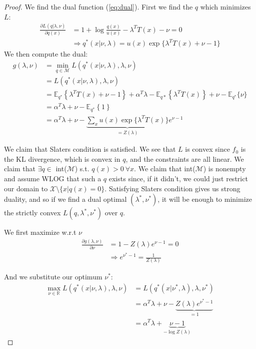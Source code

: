 \documentclass[]{article}
\theoremstyle{mattstyle}
\theoremstyle{definition}
\begin{document}
\begin{proof}
	We find the dual function (\ref{eq:dual}). First we find the $q$ which minimizes $L$:
	\begin{align*}
	\frac{\partial L(q| \lambda, \nu)}{\partial q(x)} &= 1 + \log \frac{q(x)}{u(x)} -  \lambda^TT(x) - \nu = 0\\
	&\Rightarrow q^*(x| \nu, \lambda) = u(x)\exp\{ \lambda^TT(x) + \nu -1\}
	\end{align*}
	We then compute the dual:
	\begin{align*}
	g(\lambda, \nu) &=\min\limits_{q\in \mathcal{M}} L(q^*(x| \nu, \lambda),\lambda,\nu)\\
	&= L(q^*(x| \nu, \lambda),\lambda,\nu)\\
	&= \mathbb{E}_{q^*}\left\{ \lambda^TT(x) + \nu -1 \right\} +  \alpha^T\lambda - \mathbb{E}_{q*}\left\{\lambda^TT(x)\right\} + \nu - \mathbb{E}_{q^*}\{\nu\}\\
	&=\alpha^T\lambda + \nu - \mathbb{E}_{q^*}\left\{1\right\}\\
	&=\alpha^T\lambda + \nu - \underbrace{\sum_x u(x)\exp\{ \lambda^TT(x)\}}_{=Z(\lambda)}e^{\nu -1}
	\end{align*}
	
	We claim that Slaters condition is satisfied. We see that $L$ is convex since $f_0$ is the KL divergence, which is convex in $q$, and the constraints are all linear. We claim that $\exists q \in$ int($\mathcal{M}$) s.t. $q(x)>0 \ \forall x$. We claim that int($\mathcal{M}$) is nonempty and assume WLOG that such a $q$ exists since, if it didn't, we could just restrict our domain to $\mathcal{X} \setminus \{ x | q(x) = 0 \}$. Satisfying Slaters condition gives us strong duality, and so if we find a dual optimal $(\lambda^*, \nu^*)$, it will be enough to minimize the strictly convex $L(q, \lambda^*, \nu^*)$ over $q$.
	
	We first maximize w.r.t $\nu$
	\begin{align*}
	\frac{\partial  g(\lambda, \nu)}{\partial \nu } &= 1 - Z(\lambda)e^{\nu -1} = 0\\
	&\Rightarrow  e^{\nu^*-1} = \frac{1}{Z(\lambda)}
	\end{align*}
	
	And we substitute our optimum $\nu^*$:
	\begin{align*}
	\max\limits_{\nu \in \mathbb{R}} L(q^*(x| \nu, \lambda),\lambda,\nu) &= L(q^*(x| \nu^*, \lambda),\lambda,\nu^*)\\
	&= \alpha^T\lambda + \nu - \underbrace{Z(\lambda)e^{\nu^* -1}}_{=1}\\
	&= \alpha^T\lambda + \underbrace{\nu - 1}_{-\log Z(\lambda)}
	\end{align*}
	

\end{proof}
\end{document}
